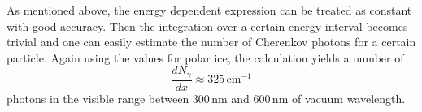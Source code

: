 As mentioned above, the energy dependent expression can be treated as constant 
with good accuracy. Then the integration over a certain energy interval becomes 
trivial and one can easily estimate the number of Cherenkov photons for a
certain particle. Again using the values for polar ice, the calculation yields a 
number of
\begin{equation}
  \frac{dN_{\gamma}}{dx} \approx 325 \,\mathrm{cm}^{-1}
  \label{eqn:Chkov_Nphot_per_track_length}
\end{equation}
photons in the visible range between 300\,nm and 600\,nm of vacuum wavelength. 
